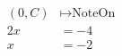 \documentclass[preview]{standalone}
\begin{document}
\begin{align*}
(0,C) & \mapsto \text{NoteOn} \\ 2x & = -4 \\ x & = -2
\end{align*}
\end{document}
